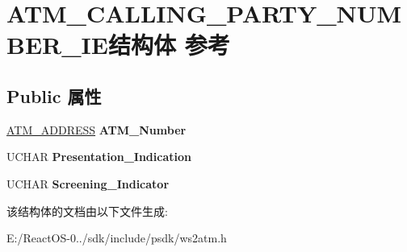 \hypertarget{struct_a_t_m___c_a_l_l_i_n_g___p_a_r_t_y___n_u_m_b_e_r___i_e}{}\section{A\+T\+M\+\_\+\+C\+A\+L\+L\+I\+N\+G\+\_\+\+P\+A\+R\+T\+Y\+\_\+\+N\+U\+M\+B\+E\+R\+\_\+\+I\+E结构体 参考}
\label{struct_a_t_m___c_a_l_l_i_n_g___p_a_r_t_y___n_u_m_b_e_r___i_e}
\subsection*{Public 属性}
\begin{DoxyCompactItemize}
\item 
\mbox{\label{struct_a_t_m___c_a_l_l_i_n_g___p_a_r_t_y___n_u_m_b_e_r___i_e_af27b7f371ce4cb982ed90ce124604deb}} 
\hyperlink{struct_a_t_m___a_d_d_r_e_s_s}{A\+T\+M\+\_\+\+A\+D\+D\+R\+E\+SS} {\bfseries A\+T\+M\+\_\+\+Number}
\item 
\mbox{\label{struct_a_t_m___c_a_l_l_i_n_g___p_a_r_t_y___n_u_m_b_e_r___i_e_aeb4dbb202042ba014d4feac649c0d589}} 
U\+C\+H\+AR {\bfseries Presentation\+\_\+\+Indication}
\item 
\mbox{\label{struct_a_t_m___c_a_l_l_i_n_g___p_a_r_t_y___n_u_m_b_e_r___i_e_a916be99756f5dccae9728ba1d7a43362}} 
U\+C\+H\+AR {\bfseries Screening\+\_\+\+Indicator}
\end{DoxyCompactItemize}


该结构体的文档由以下文件生成\+:\begin{DoxyCompactItemize}
\item 
E\+:/\+React\+O\+S-\/0../sdk/include/psdk/ws2atm.\+h\end{DoxyCompactItemize}
